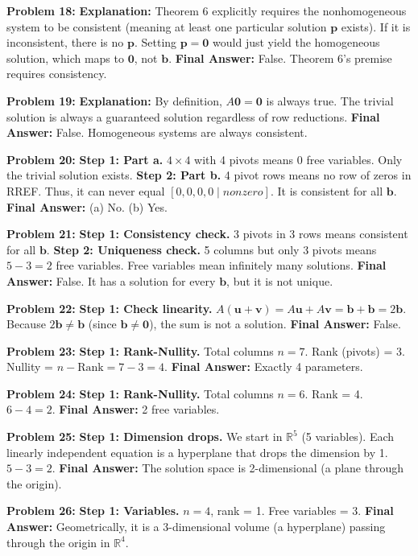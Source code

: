 \documentclass[12pt]{article}
\begin{document}
\textbf{Problem 18:}
\textbf{Explanation:} Theorem 6 explicitly requires the nonhomogeneous system to be consistent (meaning at least one particular solution $\mathbf{p}$ exists). If it is inconsistent, there is no $\mathbf{p}$. Setting $\mathbf{p} = \mathbf{0}$ would just yield the homogeneous solution, which maps to $\mathbf{0}$, not $\mathbf{b}$.
\textbf{Final Answer:} False. Theorem 6's premise requires consistency.

\textbf{Problem 19:}
\textbf{Explanation:} By definition, $A\mathbf{0} = \mathbf{0}$ is always true. The trivial solution is always a guaranteed solution regardless of row reductions.
\textbf{Final Answer:} False. Homogeneous systems are always consistent.

\textbf{Problem 20:}
\textbf{Step 1: Part a.} $4 \times 4$ with 4 pivots means 0 free variables. Only the trivial solution exists.
\textbf{Step 2: Part b.} 4 pivot rows means no row of zeros in RREF. Thus, it can never equal $[0, 0, 0, 0 \mid nonzero]$. It is consistent for all $\mathbf{b}$.
\textbf{Final Answer:} (a) No. (b) Yes.

\textbf{Problem 21:}
\textbf{Step 1: Consistency check.} 3 pivots in 3 rows means consistent for all $\mathbf{b}$.
\textbf{Step 2: Uniqueness check.} 5 columns but only 3 pivots means $5 - 3 = 2$ free variables. Free variables mean infinitely many solutions.
\textbf{Final Answer:} False. It has a solution for every $\mathbf{b}$, but it is not unique.

\textbf{Problem 22:}
\textbf{Step 1: Check linearity.} $A(\mathbf{u} + \mathbf{v}) = A\mathbf{u} + A\mathbf{v} = \mathbf{b} + \mathbf{b} = 2\mathbf{b}$. Because $2\mathbf{b} \neq \mathbf{b}$ (since $\mathbf{b} \neq \mathbf{0}$), the sum is not a solution.
\textbf{Final Answer:} False.

\textbf{Problem 23:}
\textbf{Step 1: Rank-Nullity.} Total columns $n = 7$. Rank (pivots) = 3. 
Nullity = $n - \text{Rank} = 7 - 3 = 4$.
\textbf{Final Answer:} Exactly 4 parameters.

\textbf{Problem 24:}
\textbf{Step 1: Rank-Nullity.} Total columns $n = 6$. Rank = 4.
$6 - 4 = 2$.
\textbf{Final Answer:} 2 free variables.

\textbf{Problem 25:}
\textbf{Step 1: Dimension drops.} We start in $\mathbb{R}^5$ (5 variables). Each linearly independent equation is a hyperplane that drops the dimension by 1. $5 - 3 = 2$.
\textbf{Final Answer:} The solution space is 2-dimensional (a plane through the origin).

\textbf{Problem 26:}
\textbf{Step 1: Variables.} $n = 4$, rank = 1. Free variables = 3.
\textbf{Final Answer:} Geometrically, it is a 3-dimensional volume (a hyperplane) passing through the origin in $\mathbb{R}^4$.
\end{document}

